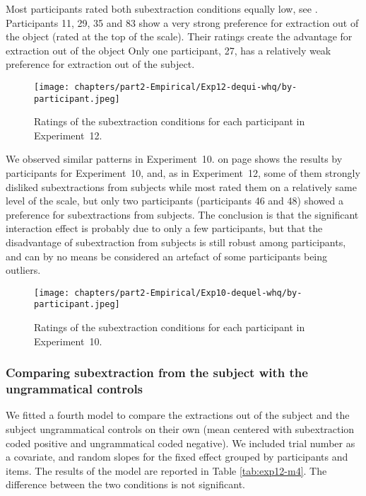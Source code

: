 Most participants rated both subextraction conditions equally low, see .
Participants 11, 29, 35 and 83 show a very strong preference for extraction out of the object (rated at the top of the scale). Their ratings create the advantage for extraction out of the object
Only one participant, 27, has a relatively weak preference for  extraction out of the subject. 

\begin{figure}
    \centering
    \texttt{[image: chapters/part2-Empirical/Exp12-dequi-whq/by-participant.jpeg]}
    \caption{Ratings of the subextraction conditions for each participant in Experiment~12.}
    \label{fig:exp12-byparticipant}
\end{figure}

We observed similar patterns in Experiment~10.  on page \pageref{fig:exp10-byparticipant} shows the results by participants for Experiment~10, and, as in Experiment~12, some of them strongly disliked subextractions from subjects while most rated them on a relatively same level of the scale, but only two participants (participants 46 and 48) showed a preference for subextractions from subjects. The conclusion is that the significant interaction effect is probably due to only a few participants, but that the disadvantage of subextraction from subjects is still robust among participants, and can by no means be considered an artefact of some participants being outliers. 

\begin{figure}
    \centering
    \texttt{[image: chapters/part2-Empirical/Exp10-dequel-whq/by-participant.jpeg]}
    \caption{Ratings of the subextraction conditions for each participant in Experiment~10.}
    \label{fig:exp10-byparticipant}
\end{figure}

\subsubsection{Comparing subextraction from the subject with the ungrammatical controls}

We fitted a fourth model to compare the extractions out of the subject and the subject ungrammatical controls on their own (mean centered with subextraction coded positive and ungrammatical coded negative). We included trial number as a covariate, and random slopes for the fixed effect grouped by participants and items. The results of the model are reported in Table \ref{tab:exp12-m4}. 
The difference between the two conditions is not significant.


